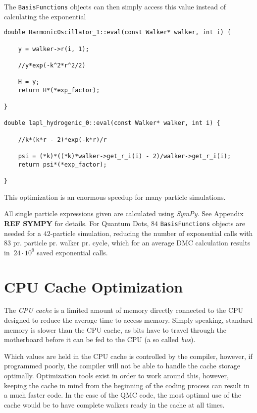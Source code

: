 The \verb+BasisFunctions+ objects can then simply access this value instead of calculating the exponential 

\begin{lstlisting}
double HarmonicOscillator_1::eval(const Walker* walker, int i) {

    y = walker->r(i, 1);
    
    //y*exp(-k^2*r^2/2)
    
    H = y;
    return H*(*exp_factor);
    
}

double lapl_hydrogenic_0::eval(const Walker* walker, int i) {
    
    //k*(k*r - 2)*exp(-k*r)/r
    
    psi = (*k)*((*k)*walker->get_r_i(i) - 2)/walker->get_r_i(i);
    return psi*(*exp_factor);
    
}
\end{lstlisting}

This optimization is an enormous speedup for many particle simulations.

All single particle expressions given are calculated using \textit{SymPy}. See Appendix \textbf{REF SYMPY} for details. For Quantum Dots, $84$ \verb+BasisFunctions+ objects are needed for a $42$-particle simulation, reducing the number of exponential calls with $83$ pr. particle pr. walker pr. cycle, which for an average DMC calculation results in $~24\cdot 10^9$ saved exponential calls.


\section{CPU Cache Optimization}
\label{sec:CPUcache}

The \textit{CPU cache} is a limited amount of memory directly connected to the CPU designed to reduce the average time to access memory. Simply speaking, standard memory is slower than the CPU cache, as bits have to travel through the motherboard before it can be fed to the CPU (a so called \textit{bus}). 

Which values are held in the CPU cache is controlled by the compiler, however, if programmed poorly, the compiler will not be able to handle the cache storage optimally. Optimization tools exist in order to work around this, however, keeping the cache in mind from the beginning of the coding process can result in a much faster code. In the case of the QMC code, the most optimal use of the cache would be to have complete walkers ready in the cache at all times. 

